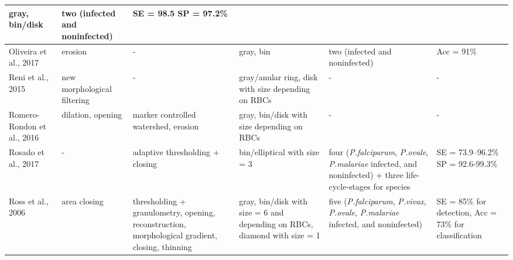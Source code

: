 \documentclass[sensors,review,accept,moreauthors,pdftex,10pt,a4paper]{mdpi}
\begin{document}
\begin{table}[H]
\begin{tabular}{m{3cm}<{\centering}m{3cm}<{\centering}m{5cm}<{\centering}m{3cm}<{\centering}m{5cm}<{\centering}m{2cm}<{\centering}}
    	gray, bin/disk &
    	two (infected and noninfected) &
    	SE = 98.5 SP = 97.2\%
    \\	
    \midrule
    Oliveira et al., 2017  &
    	erosion &
    	-  &
    	gray, bin &
    	two (infected and noninfected) &
    	Acc = 91\%
    \\
    \midrule
    Reni et al., 2015  &
    	new morphological filtering &
    	-  &
    	gray/anular ring, disk with size depending on RBCs &
    	- &
    	-
    \\
    \midrule
    Romero-Rondon et al., 2016  &
    	dilation, opening &
    	marker controlled watershed, erosion  &
    	gray, bin/disk with size depending on RBCs &
    	- &
    	-
    \\
        \midrule
      Rosado et al., 2017  &
    	- &
    	adaptive thresholding + closing  &
    	bin/elliptical with size = 3 &
    	four (\emph{P.falciparum}, \emph{P.ovale}, \emph{P.malariae} infected, and noninfected) +
    three life-cycle-stages for species &
    	SE = 73.9--96.2\% SP = 92.6-99.3\%
    \\
    \midrule
    Ross et al., 2006  &
    	area closing &
    	thresholding + granulometry, opening, reconstruction, morphological gradient, closing, thinning  &
        gray, bin/disk with size = 6 and depending on RBCs, diamond with size = 1 &
    	five (\emph{P.falciparum}, \emph{P.vivax}, \emph{P.ovale}, \emph{P.malariae} infected, and noninfected) &
    	SE = 85\% for detection, Acc = 73\% for classification
    \\
    	\bottomrule
\end{tabular}  \end{table}
\end{document}

